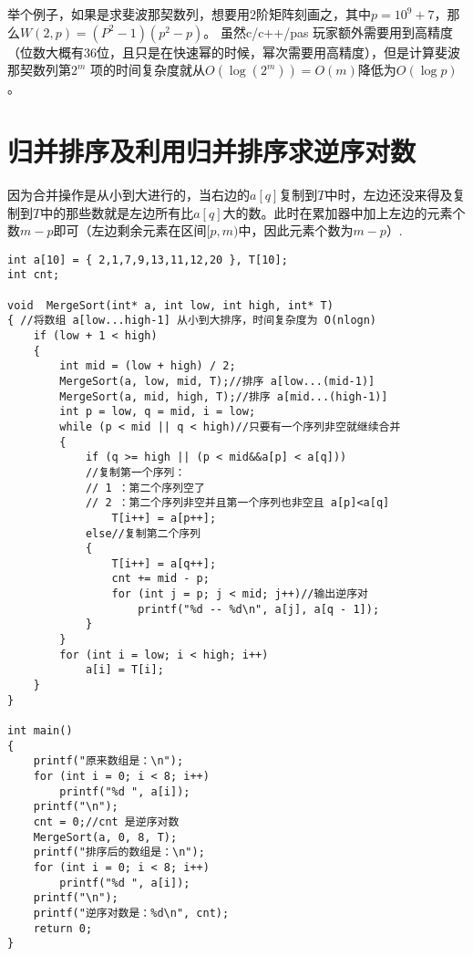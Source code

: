 举个例子，如果是求斐波那契数列，想要用$2$阶矩阵刻画之，其中$p=10^{9}+7$，那么$W(2,p)=(P^{2}-1)(p^2-p)$。 虽然c/c++/pas 玩家额外需要用到高精度（位数大概有$36$位，且只是在快速幂的时候，幂次需要用高精度），但是计算斐波那契数列第$2^m$ 项的时间复杂度就从$O(\log (2^m))=O(m)$降低为$O(\log p)$。

\clearpage
\section{归并排序及利用归并排序求逆序对数}

因为合并操作是从小到大进行的，当右边的$a[q]$复制到$T$中时，左边还没来得及复制到$T$中的那些数就是左边所有比$a[q]$大的数。此时在累加器中加上左边的元素个数$m-p$即可（左边剩余元素在区间$[p,m)$中，因此元素个数为$m-p$）.

\begin{lstlisting}
int a[10] = { 2,1,7,9,13,11,12,20 }, T[10];
int cnt;

void  MergeSort(int* a, int low, int high, int* T)
{ //将数组 a[low...high-1] 从小到大排序，时间复杂度为 O(nlogn)
    if (low + 1 < high)
    {
        int mid = (low + high) / 2;
        MergeSort(a, low, mid, T);//排序 a[low...(mid-1)]
        MergeSort(a, mid, high, T);//排序 a[mid...(high-1)]
        int p = low, q = mid, i = low;
        while (p < mid || q < high)//只要有一个序列非空就继续合并
        {
            if (q >= high || (p < mid&&a[p] < a[q]))
            //复制第一个序列：
            // 1 ：第二个序列空了
            // 2 ：第二个序列非空并且第一个序列也非空且 a[p]<a[q]
                T[i++] = a[p++];
            else//复制第二个序列
            {
                T[i++] = a[q++];
                cnt += mid - p;
                for (int j = p; j < mid; j++)//输出逆序对
                    printf("%d -- %d\n", a[j], a[q - 1]);
            }
        }
        for (int i = low; i < high; i++)
            a[i] = T[i];
    }
}

int main()
{
    printf("原来数组是：\n");
    for (int i = 0; i < 8; i++)
        printf("%d ", a[i]);
    printf("\n");
    cnt = 0;//cnt 是逆序对数
    MergeSort(a, 0, 8, T);
    printf("排序后的数组是：\n");
    for (int i = 0; i < 8; i++)
        printf("%d ", a[i]);
    printf("\n");
    printf("逆序对数是：%d\n", cnt);
    return 0;
}
\end{lstlisting}

